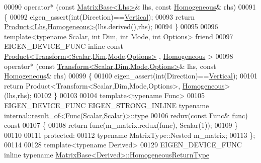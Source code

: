 \begin{DoxyCode}
00090     operator* (\textcolor{keyword}{const} \hyperlink{group___core___module_class_eigen_1_1_matrix_base}{MatrixBase<Lhs>}& lhs, \textcolor{keyword}{const} \hyperlink{group___geometry___module_class_eigen_1_1_homogeneous}{Homogeneous}& rhs)
00091     \{
00092       eigen\_assert(\textcolor{keywordtype}{int}(Direction)==\hyperlink{group__enums_ggad49a7b3738e273eb00932271b36127f7addca718e0564723df21d61b94b1198be}{Vertical});
00093       \textcolor{keywordflow}{return} \hyperlink{group___core___module_class_eigen_1_1_product}{Product<Lhs,Homogeneous>}(lhs.derived(),rhs);
00094     \}
00095 
00096     \textcolor{keyword}{template}<\textcolor{keyword}{typename} Scalar, \textcolor{keywordtype}{int} Dim, \textcolor{keywordtype}{int} Mode, \textcolor{keywordtype}{int} Options> \textcolor{keyword}{friend}
00097     EIGEN\_DEVICE\_FUNC \textcolor{keyword}{inline} \textcolor{keyword}{const} \hyperlink{group___core___module_class_eigen_1_1_product}{Product<Transform<Scalar,Dim,Mode,Options>}
      , \hyperlink{group___geometry___module_class_eigen_1_1_homogeneous}{Homogeneous} >
00098     operator* (\textcolor{keyword}{const} \hyperlink{group___geometry___module_class_eigen_1_1_transform}{Transform<Scalar,Dim,Mode,Options>}& lhs, \textcolor{keyword}{const} 
      \hyperlink{group___geometry___module_class_eigen_1_1_homogeneous}{Homogeneous}& rhs)
00099     \{
00100       eigen\_assert(\textcolor{keywordtype}{int}(Direction)==\hyperlink{group__enums_ggad49a7b3738e273eb00932271b36127f7addca718e0564723df21d61b94b1198be}{Vertical});
00101       \textcolor{keywordflow}{return} Product<Transform<Scalar,Dim,Mode,Options>, \hyperlink{group___geometry___module_class_eigen_1_1_homogeneous}{Homogeneous}>(lhs,rhs);
00102     \}
00103 
00104     \textcolor{keyword}{template}<\textcolor{keyword}{typename} Func>
00105     EIGEN\_DEVICE\_FUNC EIGEN\_STRONG\_INLINE \textcolor{keyword}{typename} 
      \hyperlink{struct_eigen_1_1internal_1_1result__of}{internal::result\_of<Func(Scalar,Scalar)>::type}
00106     redux(\textcolor{keyword}{const} Func& \hyperlink{structfunc}{func})\textcolor{keyword}{ const}
00107 \textcolor{keyword}{    }\{
00108       \textcolor{keywordflow}{return} func(m\_matrix.redux(func), Scalar(1));
00109     \}
00110 
00111   \textcolor{keyword}{protected}:
00112     \textcolor{keyword}{typename} MatrixType::Nested m\_matrix;
00113 \};
00114 
00128 \textcolor{keyword}{template}<\textcolor{keyword}{typename} Derived>
00129 EIGEN\_DEVICE\_FUNC \textcolor{keyword}{inline} \textcolor{keyword}{typename} \hyperlink{group___geometry___module_class_eigen_1_1_homogeneous}{MatrixBase<Derived>::HomogeneousReturnType}

\end{DoxyCode}
